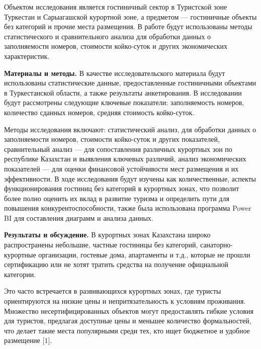 \begin{multicols}{2}
Объектом исследования является гостиничный сектор в Туристской зоне
Туркестан и Сарыагашской курортной зоне, а предметом --- гостиничные
объекты без категорий и прочие места размещения. В работе будут
использованы методы статистического и сравнительного анализа для
обработки данных о заполняемости номеров, стоимости койко-суток и других
экономических характеристик.

{\bfseries Материалы и методы.} В качестве исследовательского материала
будут использованы статистические данные, предоставленные гостиничными
объектами в Туркестанской области, а также результаты анкетирования. В
исследовании будут рассмотрены следующие ключевые показатели:
заполняемость номеров, количество сданных номеров, средняя стоимость
койко-суток.

Методы исследования включают: статистический анализ, для обработки
данных о заполняемости номеров, стоимости койко-суток и других
показателей, сравнительный анализ --- для сопоставления различных
курортных зон по республике Казахстан и выявления ключевых различий,
анализ экономических показателей --- для оценки финансовой устойчивости
мест размещения и их эффективности. В ходе исследования будут изучены
как количественные, аспекты функционирования гостиниц без категорий в
курортных зонах, что позволит более полно оценить их вклад в развитие
туризма и определить пути для повышения конкурентоспособности, также
была использована программа Power BI для составления диаграмм и анализа
данных.

{\bfseries Результаты и обсуждение.} В курортных зонах Казахстана широко
распространены небольшие, частные гостиницы без категорий,
санаторно-курортные организации, гостевые дома, апартаменты и т.д.,
которые не прошли сертификацию или не хотят тратить средства на
получение официальной категории.

Это часто встречается в развивающихся курортных зонах, где туристы
ориентируются на низкие цены и непритязательность к условиям проживания.
Множество несертифицированных объектов могут предоставлять гибкие
условия для туристов, предлагая доступные цены и меньшее количество
формальностей, что делает такие места популярными среди тех, кто ищет
бюджетное и удобное размещение {[}1{]}.


\end{multicols}
